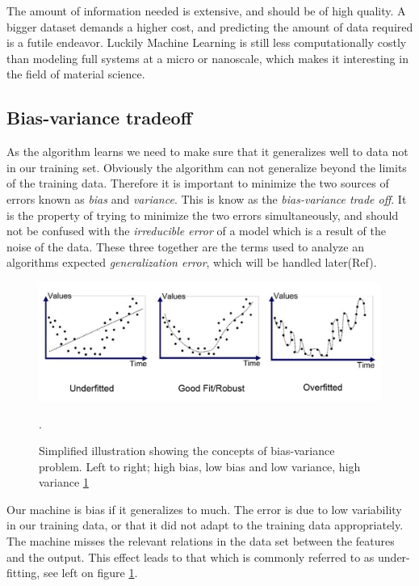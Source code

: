 	The amount of information needed is extensive, and should be of high quality. A bigger dataset demands a higher cost, and predicting the amount of data required is a futile endeavor. Luckily Machine Learning is still less computationally costly than modeling full systems at a micro or nanoscale, which makes it interesting in the field of material science. 
	
	
\subsection{Bias-variance tradeoff}\label{sec:Bias-variance tradeoff}

As the algorithm learns we need to make sure that it generalizes well to data not in our training set. Obviously the algorithm can not generalize beyond the limits of the training data. Therefore it is important to minimize the two sources of errors known as \textit{bias} and \textit{variance}. This is know as the \textit{bias-variance trade off}. It is the property of trying to minimize the two errors simultaneously, and should not be confused with the \textit{irreducible error} of a model which is a result of the noise of the data. These three together are the terms used to analyze an algorithms expected \textit{generalization error}, which will be handled later(Ref).    

\begin{figure}[H]
     \centering
     \includegraphics[width=\linewidth]{theory/figures/Bias_variance.png}
     \caption{Simplified illustration showing the concepts of bias-variance problem. Left to right; high bias, low bias and low variance, high variance \ref{fig:bias_var}}.
     \label{fig:bias_var}
\end{figure}
Our machine is bias if it generalizes to much. The error is due to low variability in our training data, or that it did not adapt to the training data appropriately. The machine misses the relevant relations in the data set between the features and the output. This effect leads to that which is commonly referred to as under-fitting, see left on figure \ref{fig:bias_var}. 

